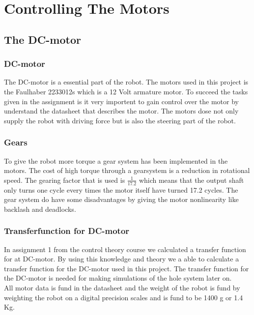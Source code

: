 \chapter{Controlling The Motors}





\section {The DC-motor}


\subsection{DC-motor}
The DC-motor is a essential part of the robot. The motors used in this project is the Faulhaber 2233012s which is a 12 Volt armature motor.  To succeed the tasks given in the assignment is it very importent to gain control over the motor by understand the datasheet that describes the motor. The motors dose not only supply the robot with driving force but is also the steering part of the robot.

\subsection{Gears}
To give the robot more torque a gear system has been implemented in the motors. The cost of high torque through a gearsystem is a reduction in rotational speed. The gearing factor that is used is $\frac{1}{17.2}$ which means that the output shaft only turns one cycle every times the motor itself have turned 17.2 cycles. The gear system do have some disadvantages by giving the motor nonlinearity like backlash and deadlocks. 
\subsection{Transferfunction for DC-motor}
In assignment 1 from the control theory course we calculated a transfer function for at DC-motor. By using this knowledge and theory we a able to calculate a transfer function for the DC-motor used in this project.
The transfer function for the DC-motor is needed for making simulations of the hole system later on.\\
All motor data is fund in the datasheet and the weight of the robot is fund by weighting the robot on a digital precision scales and is fund to be 1400 g or 1.4 Kg. \\

